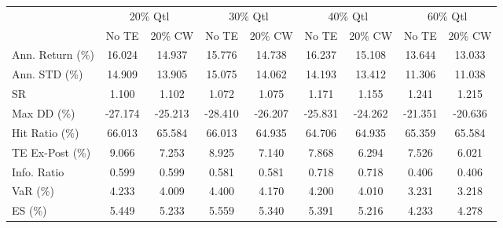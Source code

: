 \begin{tabular}{lcccccccc}
\toprule
{} & \multicolumn{2}{c}{20\% Qtl} & \multicolumn{2}{c}{30\% Qtl} & \multicolumn{2}{c}{40\% Qtl} & \multicolumn{2}{c}{60\% Qtl} \\
{} &   No TE &  20\% CW &   No TE &  20\% CW &   No TE &  20\% CW &   No TE &  20\% CW \\
\midrule
Ann. Return (\%) &  16.024 &  14.937 &  15.776 &  14.738 &  16.237 &  15.108 &  13.644 &  13.033 \\
Ann. STD (\%)    &  14.909 &  13.905 &  15.075 &  14.062 &  14.193 &  13.412 &  11.306 &  11.038 \\
SR              &   1.100 &   1.102 &   1.072 &   1.075 &   1.171 &   1.155 &   1.241 &   1.215 \\
Max DD (\%)      & -27.174 & -25.213 & -28.410 & -26.207 & -25.831 & -24.262 & -21.351 & -20.636 \\
Hit Ratio (\%)   &  66.013 &  65.584 &  66.013 &  64.935 &  64.706 &  64.935 &  65.359 &  65.584 \\
TE Ex-Post (\%)  &   9.066 &   7.253 &   8.925 &   7.140 &   7.868 &   6.294 &   7.526 &   6.021 \\
Info. Ratio     &   0.599 &   0.599 &   0.581 &   0.581 &   0.718 &   0.718 &   0.406 &   0.406 \\
VaR (\%)         &   4.233 &   4.009 &   4.400 &   4.170 &   4.200 &   4.010 &   3.231 &   3.218 \\
ES (\%)          &   5.449 &   5.233 &   5.559 &   5.340 &   5.391 &   5.216 &   4.233 &   4.278 \\
\bottomrule
\end{tabular}
